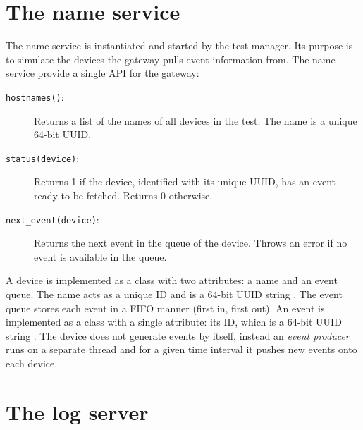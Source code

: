 \section{The name service}

The name service is instantiated and started by the test manager. Its purpose
is to simulate the devices the gateway pulls event information from. The name
service provide a single API for the gateway:

\begin{description}
    \item[\texttt{hostnames()}:] Returns a list of the names of all devices in
the test. The name is a unique 64-bit UUID.
    \item[\texttt{status(device)}:] Returns 1 if the device, identified with
its unique UUID, has an event ready to be fetched. Returns 0 otherwise.
    \item[\texttt{next\_event(device)}:] Returns the next event in the queue of
the device. Throws an error if no event is available in the queue.
\end{description}


A device is implemented as a class with two attributes: a name and an event
queue. The name acts as a unique ID and is a 64-bit UUID string . The event queue stores each event in a FIFO manner (first in, first
out). An event is implemented as a class with a single attribute: its ID, which
is a 64-bit UUID string . The device does not generate
events by itself, instead an \textit{event producer} runs on a separate thread
and for a given time interval it pushes new events onto each device.

\section{The log server}
\label{sec:log_server}

